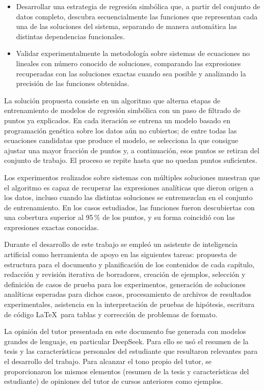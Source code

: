 \begin{introduction}
\begin{itemize}
	\item Desarrollar una estrategia de regresión simbólica que, a partir del conjunto de datos completo, descubra secuencialmente las funciones que representan cada una de las soluciones del sistema, separando de manera automática las distintas dependencias funcionales.

	\item Validar experimentalmente la metodología sobre sistemas de ecuaciones no lineales con número conocido de soluciones, comparando las expresiones recuperadas con las soluciones exactas cuando sea posible y analizando la precisión de las funciones obtenidas.
\end{itemize}

La solución propuesta consiste en un algoritmo que alterna etapas de entrenamiento de modelos de regresión simbólica con un paso de filtrado de puntos ya explicados. En cada iteración se entrena un modelo basado en programación genética sobre los datos aún no cubiertos; de entre todas las ecuaciones candidatas que produce el modelo, se selecciona la que consigue ajustar una mayor fracción de puntos y, a continuación, esos puntos se retiran del conjunto de trabajo. El proceso se repite hasta que no quedan puntos suficientes.

Los experimentos realizados sobre sistemas con múltiples soluciones muestran que el algoritmo es capaz de recuperar las expresiones analíticas que dieron origen a los datos, incluso cuando las distintas soluciones se entremezclan en el conjunto de entrenamiento. En los casos estudiados, las funciones fueron descubiertas con una cobertura superior al 95\,\% de los puntos, y su forma coincidió con las expresiones exactas conocidas.

Durante el desarrollo de este trabajo se empleó un asistente de inteligencia artificial como herramienta de apoyo en las siguientes tareas: propuesta de estructura para el documento y planificación de los contenidos de cada capítulo, redacción y revisión iterativa de borradores, creación de ejemplos, selección y definición de casos de prueba para los experimentos, generación de soluciones analíticas esperadas para dichos casos, procesamiento de archivos de resultados experimentales, asistencia en la interpretación de pruebas de hipótesis, escritura de código \LaTeX\ para tablas y corrección de problemas de formato. 

La opinión del tutor presentada en este documento fue generada con modelos grandes de lenguaje, en particular DeepSeek. Para ello se usó el resumen de la tesis y las características personales del estudiante que resultaron relevantes para el desarrollo del trabajo. Para alcanzar el tono propio del tutor, se proporcionaron los mismos elementos (resumen de la tesis y características del estudiante) de opiniones del tutor de cursos anteriores como ejemplos.


\end{introduction}
